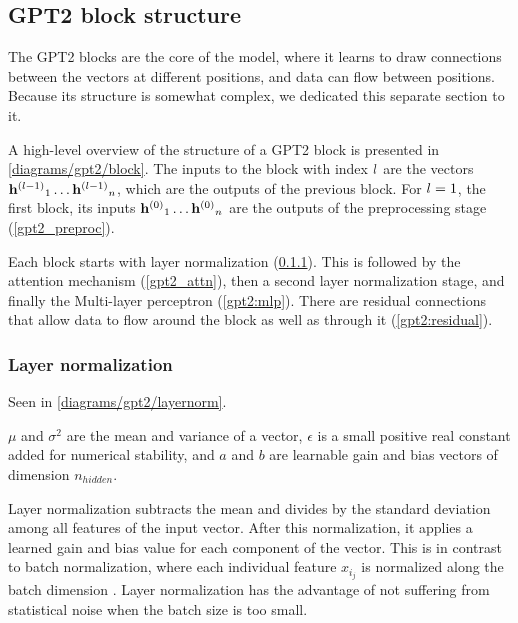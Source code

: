 \subsection{GPT2 block structure}
\label{gpt2:block}

The GPT2 blocks are the core of the model, where it learns to draw connections between the vectors at different positions, and data can flow between positions.
Because its structure is somewhat complex, we dedicated this separate section to it.

A high-level overview of the structure of a GPT2 block is presented in \cref{diagrams/gpt2/block}.
The inputs to the block with index ${l}$ are the vectors ${\mathbf{h}^{(l-1)}}_1 \ldots {\mathbf{h}^{(l-1)}}_n$, which are the outputs of the previous block. For ${l} = 1$, the first block, its inputs ${\mathbf{h}^{(0)}}_1 \ldots {\mathbf{h}^{(0)}}_n$ are the outputs of the preprocessing stage (\cref{gpt2_preproc}).

Each block starts with layer normalization (\cref{gpt2:layernorm}). This is followed by the attention mechanism (\cref{gpt2_attn}), then a second layer normalization stage, and finally the Multi-layer perceptron (\cref{gpt2:mlp}). There are residual connections that allow data to flow around the block as well as through it (\cref{gpt2:residual}).





\subsubsection{Layer normalization}
\label{gpt2:layernorm}

Seen in \cref{diagrams/gpt2/layernorm}.


$\mu$ and $\sigma^2$ are the mean and variance of a vector, $\epsilon$ is a small positive real constant added for numerical stability, and $a$ and $b$ are learnable gain and bias vectors of dimension $n_{hidden}$.

Layer normalization subtracts the mean and divides by the standard deviation among all features of the input vector.
After this normalization, it applies a learned gain and bias value for each component of the vector.
This is in contrast to batch normalization, where each individual feature $x_{i_j}$ is normalized along the batch dimension .
Layer normalization has the advantage of not suffering from statistical noise when the batch size is too small.

